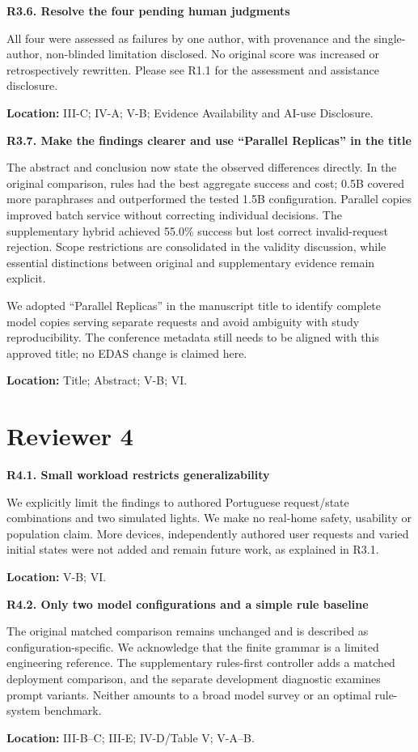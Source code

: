 \documentclass[11pt,a4paper]{article}
\newcommand{\point}[2]{\vspace{4pt}\textbf{#1. #2}\par}
\newcommand{\where}[1]{\par{\small\textcolor{ink}{\textbf{Location:} #1}}\par}
\begin{document}
\point{R3.6}{Resolve the four pending human judgments}
All four were assessed as failures by one author, with provenance and the single-author, non-blinded limitation disclosed. No original score was increased or retrospectively rewritten. Please see R1.1 for the assessment and assistance disclosure.
\where{III-C; IV-A; V-B; Evidence Availability and AI-use Disclosure.}

\point{R3.7}{Make the findings clearer and use ``Parallel Replicas'' in the title}
The abstract and conclusion now state the observed differences directly. In the original comparison, rules had the best aggregate success and cost; 0.5B covered more paraphrases and outperformed the tested 1.5B configuration. Parallel copies improved batch service without correcting individual decisions. The supplementary hybrid achieved 55.0\% success but lost correct invalid-request rejection. Scope restrictions are consolidated in the validity discussion, while essential distinctions between original and supplementary evidence remain explicit.

We adopted ``Parallel Replicas'' in the manuscript title to identify complete model copies serving separate requests and avoid ambiguity with study reproducibility. The conference metadata still needs to be aligned with this approved title; no EDAS change is claimed here.
\where{Title; Abstract; V-B; VI.}

\newpage
\section*{Reviewer 4}
\point{R4.1}{Small workload restricts generalizability}
We explicitly limit the findings to authored Portuguese request/state combinations and two simulated lights. We make no real-home safety, usability or population claim. More devices, independently authored user requests and varied initial states were not added and remain future work, as explained in R3.1.
\where{V-B; VI.}

\point{R4.2}{Only two model configurations and a simple rule baseline}
The original matched comparison remains unchanged and is described as configuration-specific. We acknowledge that the finite grammar is a limited engineering reference. The supplementary rules-first controller adds a matched deployment comparison, and the separate development diagnostic examines prompt variants. Neither amounts to a broad model survey or an optimal rule-system benchmark.
\where{III-B--C; III-E; IV-D/Table V; V-A--B.}
\end{document}
